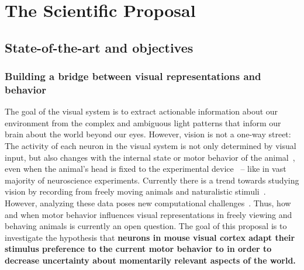 \documentclass[B2,COG]{ercgrant}
\begin{document}
\maketitle



\chapter{The Scientific Proposal}


\section{State-of-the-art and objectives}\label{sec:stateofart}
\subsection{Building a bridge between visual representations and behavior}
The goal of the visual system is to extract actionable information about our environment from the complex and ambiguous light patterns that inform our brain about the world beyond our eyes.
However, vision is not a one-way street: The activity of each neuron in the visual system is not only determined by visual input, but also changes with the internal state or motor behavior of the animal~\parencite{Niell2010-bs, Musall2019-kd, Erisken2014-un, Franke2022-do}, even when the animal's head is fixed to the experimental device~\parencite{Stringer2019-lt, Musall2019-kd} -- like in vast majority of neuroscience experiments.
Currently there is a trend towards studying vision by recording from freely moving animals and naturalistic stimuli~\parencite{Parker2022-ac,Holmgren2021-jv}. 
However, analyzing these data poses new computational challenges~\parencite{Busse2017-rt}. 
Thus, how and when motor behavior influences visual representations in freely viewing and behaving animals is currently an open question. 
%
The goal of this proposal is to investigate the hypothesis that \textbf{neurons in mouse visual cortex adapt their stimulus preference to the current motor behavior to in order to decrease uncertainty about momentarily relevant aspects of the world.} 
\end{document}
